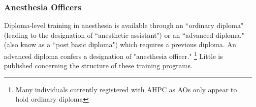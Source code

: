 \documentclass[12pt]{article} %
\begin{document}
\subsubsection{Anesthesia Officers}

Diploma-level training in anesthesia is available through an ``ordinary diploma" (leading to the designation of ``anesthetic assistant") or an ``advanced diploma," (also know as a ``post basic diploma") which requires a previous diploma. An advanced diploma confers a designation of "anesthesia officer." 
\footnote{Many individuals currently registered with AHPC as AOs only appear to hold ordinary diploma}
\cite{dsco2012}
Little is published concerning the structure of these training programs.
\end{document}
